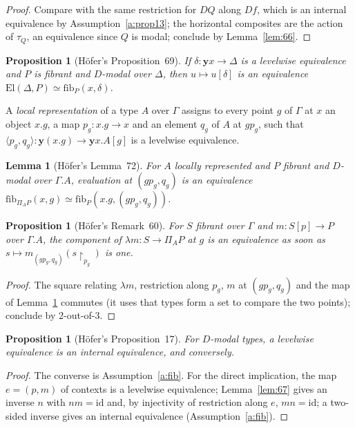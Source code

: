 \documentclass[11pt]{amsart}
\newtheorem{proposition}[theorem]{Proposition}
\newtheorem{lemma}[theorem]{Lemma}
\theoremstyle{definition}
\theoremstyle{remark}
\newcommand{\El}{\mathrm{El}}
\newcommand{\yo}{\mathbf{y}}
\newcommand{\fib}{\mathrm{fib}}
\begin{document}
\begin{proof}
Compare with the same restriction for $DQ$ along $Df$, which is an internal
equivalence by Assumption~\ref{a:prop13}; the horizontal composites are the
action of $\tau_Q$, an equivalence since $Q$ is modal; conclude by
Lemma~\ref{lem:66}.
\end{proof}

\begin{proposition}[H\"ofer's Proposition~69]\label{prop:69}
If $\delta\colon\yo x\to\Delta$ is a levelwise equivalence and $P$ is
fibrant and $D$-modal over $\Delta$, then $u\mapsto u[\delta]$ is an
equivalence $\El(\Delta,P)\simeq\fib_P(x,\delta)$.
\end{proposition}

A \emph{local representation} of a type $A$ over $\Gamma$ assigns to every
point $g$ of $\Gamma$ at $x$ an object $x.g$, a map $p_g\colon x.g\to x$ and
an element $q_g$ of $A$ at $g p_g$, such that $\langle p_g,q_g\rangle\colon
\yo(x.g)\to \yo x.A[g]$ is a levelwise equivalence.

\begin{lemma}[H\"ofer's Lemma~72]\label{lem:72}
For $A$ locally represented and $P$ fibrant and $D$-modal over
$\Gamma.A$, evaluation at $(g p_g,q_g)$ is an equivalence
$\fib_{\Pi_A P}(x,g)\simeq\fib_P(x.g,(gp_g,q_g))$.
\end{lemma}

\begin{proposition}[H\"ofer's Remark~60]\label{prop:60}
For $S$ fibrant over $\Gamma$ and $m\colon S[p]\to P$ over $\Gamma.A$, the
component of $\lambda m\colon S\to\Pi_A P$ at $g$ is an equivalence as soon
as $s\mapsto m_{(gp_g,q_g)}(s\!\restriction_{p_g})$ is one.
\end{proposition}

\begin{proof}
The square relating $\lambda m$, restriction along $p_g$, $m$ at
$(gp_g,q_g)$ and the map of Lemma~\ref{lem:72} commutes (it uses that types
form a set to compare the two points); conclude by $2$-out-of-$3$.
\end{proof}

\begin{proposition}[H\"ofer's Proposition~17]\label{prop:17}
For $D$-modal types, a levelwise equivalence is an internal equivalence,
and conversely.
\end{proposition}

\begin{proof}
The converse is Assumption~\ref{a:fib}. For the direct implication, the
map $e = (p,m)$ of contexts is a levelwise equivalence; Lemma~\ref{lem:67}
gives an inverse $n$ with $n m = \mathrm{id}$ and, by injectivity of
restriction along $e$, $m n=\mathrm{id}$; a two-sided inverse gives an
internal equivalence (Assumption~\ref{a:fib}).
\end{proof}
\end{document}
